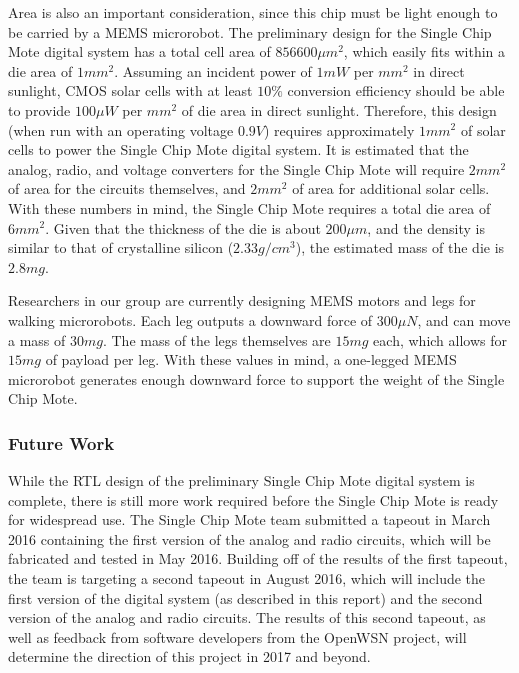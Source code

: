 Area is also an important consideration, since this chip must be light enough to be carried by a MEMS microrobot. The preliminary design for the Single Chip Mote digital system has a total cell area of $856600\mu m^2$, which easily fits within a die area of $1mm^2$. Assuming an incident power of $1mW$ per $mm^2$ in direct sunlight, CMOS solar cells with at least $10\%$ conversion efficiency should be able to provide $100\mu W$ per $mm^2$ of die area in direct sunlight. Therefore, this design (when run with an operating voltage $0.9V$) requires approximately $1mm^2$ of solar cells to power the Single Chip Mote digital system. It is estimated that the analog, radio, and voltage converters for the Single Chip Mote will require $2mm^2$ of area for the circuits themselves, and $2mm^2$ of area for additional solar cells. With these numbers in mind, the Single Chip Mote requires a total die area of $6mm^2$. Given that the thickness of the die is about $200\mu m$, and the density is similar to that of crystalline silicon ($2.33g/cm^3$), the estimated mass of the die is $2.8mg$.

Researchers in our group are currently designing MEMS motors and legs for walking microrobots. Each leg outputs a downward force of $300\mu N$, and can move a mass of $30mg$. The mass of the legs themselves are $15mg$ each, which allows for $15mg$ of payload per leg. With these values in mind, a one-legged MEMS microrobot generates enough downward force to support the weight of the Single Chip Mote.


\subsubsection{Future Work}
While the RTL design of the preliminary Single Chip Mote digital system is complete, there is still more work required before the Single Chip Mote is ready for widespread use. The Single Chip Mote team submitted a tapeout in March 2016 containing the first version of the analog and radio circuits, which will be fabricated and tested in May 2016. Building off of the results of the first tapeout, the team is targeting a second tapeout in August 2016, which will include the first version of the digital system (as described in this report) and the second version of the analog and radio circuits. The results of this second tapeout, as well as feedback from software developers from the OpenWSN project, will determine the direction of this project in 2017 and beyond.

